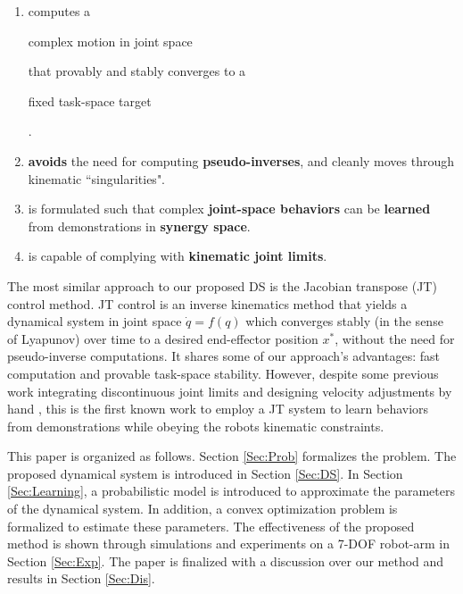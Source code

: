 \documentclass[letterpaper, 10 pt, conference,fleqn]{ieeeconf}
\begin{document}
\begin{enumerate}[leftmargin=*]
\item computes a \begin{bf}complex motion in joint space\end{bf} that provably and stably converges to a \begin{bf}fixed task-space target\end{bf}.
\item \textbf{avoids} the need for computing \textbf{pseudo-inverses}, and cleanly moves through kinematic ``singularities".
\item is formulated such that complex \textbf{joint-space behaviors} can be \textbf{learned} from demonstrations in \textbf{synergy space}.

\item is capable of complying with \textbf{kinematic joint limits}.
\end{enumerate}

The most similar approach to our proposed DS is the Jacobian transpose (JT) control \cite{wolovich1984computational} method. JT control is an inverse kinematics
method that yields a dynamical system in joint space $\dot{q} = f(q)$ which converges stably (in the sense of Lyapunov) over time to a desired end-effector position $x^*$, without the need for pseudo-inverse computations. It shares some of our approach's advantages: fast computation and provable task-space stability. However, despite some previous work integrating discontinuous joint limits \cite{sciavicco1988solution} and designing velocity adjustments by hand \cite{Shi2016}, this is the first known work to employ a JT system to learn behaviors from demonstrations while obeying the robots kinematic constraints.

This paper is organized as follows. Section \ref{Sec:Prob} formalizes the problem. The proposed dynamical system is introduced in Section \ref{Sec:DS}. In Section \ref{Sec:Learning}, a probabilistic model is introduced to approximate the parameters of the dynamical system. In addition, a convex optimization problem is  formalized to estimate these parameters. The effectiveness of the proposed method is shown through simulations and experiments on a 7-DOF robot-arm in Section \ref{Sec:Exp}. The paper is finalized with a discussion over our method and results in Section \ref{Sec:Dis}.

\end{document}
